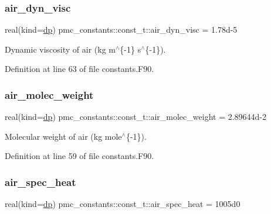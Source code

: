 \subsubsection{\texorpdfstring{air\+\_\+dyn\+\_\+visc}{air\_dyn\_visc}}
{\footnotesize\ttfamily real(kind=\mbox{\hyperlink{namespacepmc__constants_a396b7709ed4da67dac74cb46a1466ed6}{dp}}) pmc\+\_\+constants\+::const\+\_\+t\+::air\+\_\+dyn\+\_\+visc = 1.\+78d-\/5}



Dynamic viscosity of air (kg m$^\wedge$\{-\/1\} s$^\wedge$\{-\/1\}). 



Definition at line 63 of file constants.\+F90.

\mbox{\label{structpmc__constants_1_1const__t_a77edc9b47ea698fb737fd0e99ec067ff}} 
\subsubsection{\texorpdfstring{air\+\_\+molec\+\_\+weight}{air\_molec\_weight}}
{\footnotesize\ttfamily real(kind=\mbox{\hyperlink{namespacepmc__constants_a396b7709ed4da67dac74cb46a1466ed6}{dp}}) pmc\+\_\+constants\+::const\+\_\+t\+::air\+\_\+molec\+\_\+weight = 2.\+89644d-\/2}



Molecular weight of air (kg mole$^\wedge$\{-\/1\}). 



Definition at line 59 of file constants.\+F90.

\mbox{\label{structpmc__constants_1_1const__t_af3b166e76dfa3c31339781be2b06452b}} 
\subsubsection{\texorpdfstring{air\+\_\+spec\+\_\+heat}{air\_spec\_heat}}
{\footnotesize\ttfamily real(kind=\mbox{\hyperlink{namespacepmc__constants_a396b7709ed4da67dac74cb46a1466ed6}{dp}}) pmc\+\_\+constants\+::const\+\_\+t\+::air\+\_\+spec\+\_\+heat = 1005d0}



